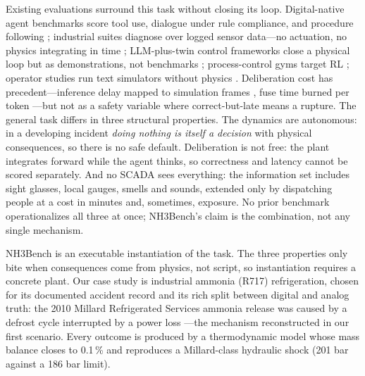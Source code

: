 \documentclass[letterpaper]{article} %
\begin{document}
Existing evaluations surround this task without closing its loop.
Digital-native agent benchmarks score tool use, dialogue under rule
compliance, and procedure following
\citep{liu2023agentbench,yao2024tau,sopbench2025}; industrial suites
diagnose over logged sensor data---no actuation, no physics integrating in
time \citep{assetops2025}; LLM-plus-twin control frameworks close a
physical loop but as demonstrations, not benchmarks \citep{vyas2024};
process-control gyms target RL \citep{pcgym2024}; operator studies run
text simulators without physics \citep{nrtbench2026}. Deliberation cost
has precedent---inference delay mapped to simulation frames
\citep{rrara2025}, fuse time burned per token \citep{gptnt2026}---but not
as a safety variable where correct-but-late means a rupture. The general
task differs in three structural properties. The dynamics are autonomous:
in a developing incident \emph{doing nothing is itself a decision} with
physical consequences, so there is no safe default. Deliberation is not
free: the plant integrates forward while the agent thinks, so correctness
and latency cannot be scored separately. And no SCADA sees everything: the
information set includes sight glasses, local gauges, smells and sounds,
extended only by dispatching people at a cost in minutes and, sometimes,
exposure. No prior benchmark operationalizes all three at once;
NH3Bench's claim is the combination, not any single mechanism.

NH3Bench is an executable instantiation of the task. The three properties
only bite when consequences come from physics, not script, so instantiation
requires a concrete plant. Our case study is industrial
ammonia (R717) refrigeration, chosen for its documented accident record and
its rich split between digital and analog truth: the 2010 Millard
Refrigerated Services ammonia release was caused by a defrost cycle
interrupted by a power loss \citep{csb2010}---the mechanism reconstructed in
our first scenario. Every outcome is produced by a thermodynamic model
whose mass balance closes to 0.1\,\% and reproduces a Millard-class
hydraulic shock (201 bar against a 186 bar limit).
\end{document}
